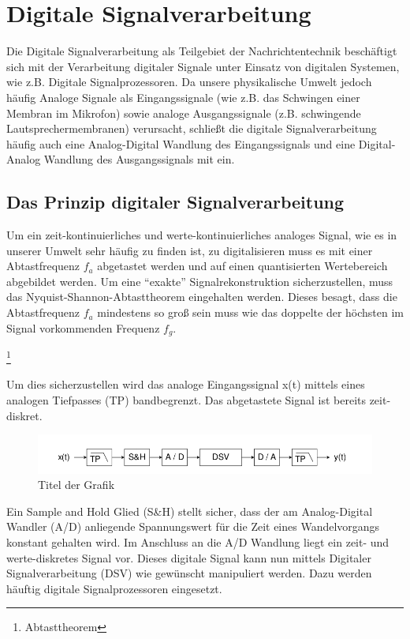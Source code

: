 \documentclass[a4paper,12pt,fontsize=12,DIV=12]{scrartcl}
\begin{document}
\section{Digitale Signalverarbeitung}
Die Digitale Signalverarbeitung als Teilgebiet der Nachrichtentechnik beschäftigt sich mit der Verarbeitung digitaler Signale unter Einsatz von digitalen Systemen, wie z.B. Digitale Signalprozessoren.
Da unsere physikalische Umwelt jedoch häufig Analoge Signale als Eingangssignale (wie z.B. das Schwingen einer Membran im Mikrofon) sowie analoge Ausgangssignale (z.B. schwingende Lautsprechermembranen) verursacht, schließt die digitale Signalverarbeitung häufig auch eine Analog-Digital Wandlung des Eingangssignals und eine Digital-Analog Wandlung des Ausgangssignals mit ein.

\subsection{Das Prinzip digitaler Signalverarbeitung}
Um ein zeit-kontinuierliches und werte-kontinuierliches analoges Signal, wie es in unserer Umwelt sehr häufig zu finden ist, zu digitalisieren muss es mit einer Abtastfrequenz $f_a$ abgetastet werden und auf einen quantisierten Wertebereich abgebildet werden. 
Um eine "`exakte"' Signalrekonstruktion sicherzustellen, muss das Nyquist-Shannon-Abtasttheorem eingehalten werden. Dieses besagt, dass die Abtastfrequenz $f_a$ mindestens so groß sein muss wie das doppelte der höchsten im Signal vorkommenden Frequenz $f_g$.
\begin{center}
 \footnote{Abtasttheorem }\\
\end{center}
Um dies sicherzustellen wird das analoge Eingangssignal x(t) mittels eines analogen Tiefpasses (TP) bandbegrenzt. Das abgetastete Signal ist bereits zeit-diskret.
%
\begin{figure}[h]
	\includegraphics[scale=0.5]{Bilder/DSV_Blockschaltbild.png}
	\caption{Titel der Grafik}
	\label{labelname}
\end{figure}
%



Ein Sample and Hold Glied (S\&H) stellt sicher, dass der am Analog-Digital Wandler (A/D) anliegende Spannungswert für die Zeit eines Wandelvorgangs konstant gehalten wird.
Im Anschluss an die A/D Wandlung liegt ein zeit- und werte-diskretes Signal vor. Dieses digitale Signal kann nun mittels Digitaler Signalverarbeitung (DSV) wie gewünscht manipuliert werden. Dazu werden häuftig digitale Signalprozessoren eingesetzt.
\end{document}
